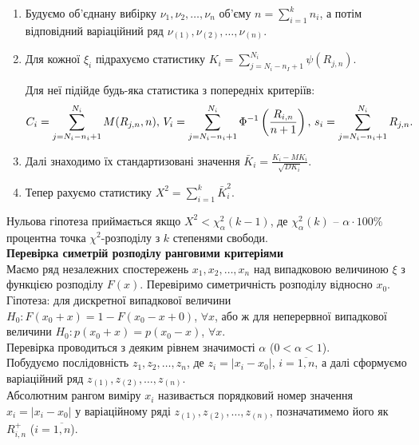 \begin{enumerate}
    \item Будуємо об'єднану вибірку $\nu_1, \nu_2, \ldots, \nu_n$ об'єму $n = \sum_{i=1}^k n_i$, а потім відповідний варіаційний ряд $\nu_{(1)}, \nu_{(2)}, \ldots, \nu_{(n)}$.
    
    \item Для кожної $\xi_i$ підрахуємо статистику $K_i = \sum_{j = N_i - n_I + 1}^{N_i} \psi(R_{j, n})$. 
    
    Для неї підійде будь-яка статистика з попередніх критеріїв:
    \[ C_i = \displaystyle\sum\limits_{j = N_i - n_i + 1}^{N_i} M(R_{j, n}, n), \, V_i = \displaystyle\sum\limits_{j = N_i - n_i + 1}^{N_i} \Phi^{-1} \left( \dfrac{R_{i,n}}{n+1} \right), \, s_i = \displaystyle\sum\limits_{j = N_i - n_i + 1}^{N_i} R_{j, n}. \]
    
    \item Далі знаходимо їх стандартизовані значення $\bar{K}_i = \frac{K_i - MK_i}{\sqrt{DK_i}}$.
    
    \item Тепер рахуємо статистику $X^2 = \sum_{i=1}^k \bar{K}_i^2$. 
\end{enumerate}

Нульова гіпотеза приймається якщо $X^2 < \chi_\alpha^2(k-1)$, де $\chi_\alpha^2(k)$ -- $\alpha \cdot 100\%$ процентна точка $\chi^2$-розподілу з $k$ степенями свободи. \\

\textbf{Перевірка симетрій розподілу ранговими критеріями} \\

Маємо ряд незалежних спостережень $x_1, x_2, \ldots, x_n$ над випадковою величиною $\xi$ з функцією розподілу $F(x)$. Перевіримо симетричність розподілу відносно $x_0$. \\

Гіпотеза: для дискретної випадкової величини $H_0: F(x_0 + x) = 1 - F(x_0 - x + 0)$, $\forall x$, або ж для неперервної випадкової величини $H_0: p(x_0 + x) = p(x_0 - x)$, $\forall x$. \\

Перевірка проводиться з деяким рівнем значимості $\alpha$ ($0 < \alpha < 1$). \\

Побудуємо послідовність $z_1, z_2, \ldots, z_n$, де $z_i = |x_i - x_0|$, $i = \overline{1, n}$, а далі сформуємо варіаційний ряд $z_{(1)}, z_{(2)}, \ldots, z_{(n)}$. \\

Абсолютним рангом виміру $x_i$ називається порядковий номер значення $x_i = |x_i - x_0|$ у варіаційному ряді $z_{(1)}, z_{(2)}, \ldots, z_{(n)}$, позначатимемо його як $R_{i,n}^+$ ($i=\overline{1,n}$). \\

